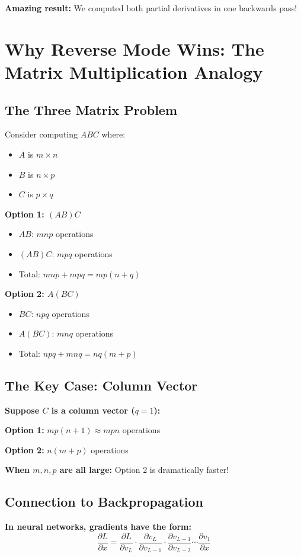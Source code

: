 \documentclass[11pt]{article}
\begin{document}
\textbf{Amazing result:} We computed both partial derivatives in one backwards pass!

\section{Why Reverse Mode Wins: The Matrix Multiplication Analogy}

\subsection{The Three Matrix Problem}
Consider computing $ABC$ where:
\begin{itemize}
\item $A$ is $m \times n$
\item $B$ is $n \times p$ 
\item $C$ is $p \times q$
\end{itemize}

\textbf{Option 1: $(AB)C$}
\begin{itemize}
\item $AB$: $mnp$ operations
\item $(AB)C$: $mpq$ operations
\item Total: $mnp + mpq = mp(n + q)$
\end{itemize}

\textbf{Option 2: $A(BC)$}
\begin{itemize}
\item $BC$: $npq$ operations
\item $A(BC)$: $mnq$ operations  
\item Total: $npq + mnq = nq(m + p)$
\end{itemize}

\subsection{The Key Case: Column Vector}
\textbf{Suppose $C$ is a column vector ($q = 1$):}

\textbf{Option 1:} $mp(n + 1) \approx mpn$ operations

\textbf{Option 2:} $n(m + p)$ operations

\textbf{When $m, n, p$ are all large:} Option 2 is dramatically faster!

\subsection{Connection to Backpropagation}
\textbf{In neural networks, gradients have the form:}
\begin{equation}
\frac{\partial L}{\partial x} = \frac{\partial L}{\partial v_L} \cdot \frac{\partial v_L}{\partial v_{L-1}} \cdot \frac{\partial v_{L-1}}{\partial v_{L-2}} \cdots \frac{\partial v_1}{\partial x}
\end{equation}
\end{document}
